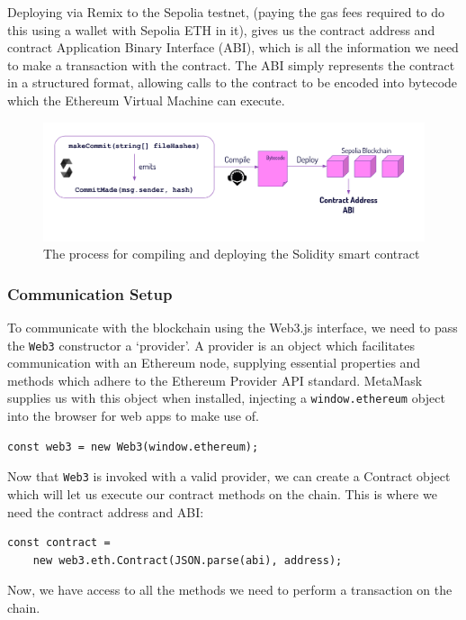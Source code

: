 \documentclass[12pt,a4paper]{article}
\begin{document}
Deploying via Remix to the Sepolia testnet, (paying the gas fees required to do this using a wallet with Sepolia ETH in it), gives us the contract address and contract Application Binary Interface (ABI), which is all the information we need to make a transaction with the contract. The ABI simply represents the contract in a structured format, allowing calls to the contract to be encoded into bytecode which the Ethereum Virtual Machine can execute.
\begin{figure}[H]
    \centering
    \includegraphics[scale=0.6]{deploy.png}
    \caption{The process for compiling and deploying the Solidity smart contract}
\end{figure}
\subsubsection{Communication Setup}
To communicate with the blockchain using the Web3.js interface, we need to pass the \verb|Web3| constructor a `provider'.
A provider is an object which facilitates communication with an Ethereum node, supplying essential properties and methods which adhere to the Ethereum Provider API standard. MetaMask supplies us with this object when installed, injecting a \verb|window.ethereum| object into the browser for web apps to make use of.
\begin{lstlisting}
const web3 = new Web3(window.ethereum);
\end{lstlisting}
Now that \verb|Web3| is invoked with a valid provider, we can create a Contract object which will let us execute our contract methods on the chain. This is where we need the contract address and ABI:
\begin{lstlisting}
const contract = 
    new web3.eth.Contract(JSON.parse(abi), address);
\end{lstlisting}
Now, we have access to all the methods we need to perform a transaction on the chain.
\end{document}

